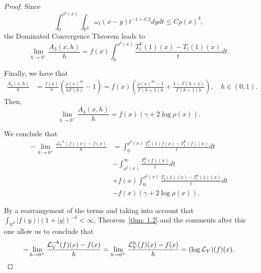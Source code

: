 \documentclass[10pt,a4paper]{amsart}
\newcommand{\RR}{\mathbb{R}}
\begin{document}
\begin{proof}
Since
\[
\int_0^{\rho^2(x)}\int_{\mathbb{R}^d}\omega_t(x-y)t^{-1+\delta/2}dydt\le C\rho(x)^\delta,
\]
the Dominated Convergence Theorem leads to
\[
\lim_{h\to 0^+}\frac{A_3(x,h)}{h}=f(x)\int_0^{\rho^2(x)}\frac{T_t^V(1)(x)-T_t(1)(x)}{t}dt.
\]



Finally, we have that
\begin{align*}
\frac{A_4(x,h)}{h}&=\frac{f(x)}{h}\left(\frac{\rho(x)^{2h}}{h\Gamma(h)}-1\right)=f(x)\left(\frac{\rho(x)^{2h}-1}{\Gamma(h+1)h}+ \frac{1-\Gamma(h+1)}{\Gamma(h+1)h}\right), \quad h\in (0,1).
\end{align*}
Then,
\[
\lim_{h\to 0^+}\frac{A_4(x,h)}{h}=f(x)( \gamma+2\log\rho(x)).
\]



We conclude that 
\begin{align*}
-\lim_{h\to 0^+}\frac{\mathcal{L}_V^{-h}(f)(x)-f(x)}{h}&=\int_0^{\rho^2(x)}\frac{T_t^V(1)f(x)-T_t^V(f)(x)}{t}dt\\
&-\int_{\rho^2(x)}^\infty \frac{T_t^V(f)(x)}{t}dt\\
&+f(x)\int_0^{\rho^2(x)}\frac{T_t(1)(x)-T_t^V(1)(x)}{t}dt\\
&-f(x)(\gamma+2\log\rho(x)).
\end{align*}


    By a rearrangement of the terms and taking into account that $\int_{\mathbb{R}^d}|f(y)|(1+|y|)^{-d}<\infty$,  Theorem~\ref{thm: 1.2} and the comments after this one allow us to conclude that
    \[-\lim_{h\to 0^+}\frac{\mathcal{L}^{-h}_V(f)(x)-f(x)}{h}=\lim_{h\to 0^+}\frac{\mathcal{L}^{h}_V(f)(x)-f(x)}{h}=(\log \mathcal{L}_V)(f)(x).\qedhere\]
\end{proof}
\end{document}
